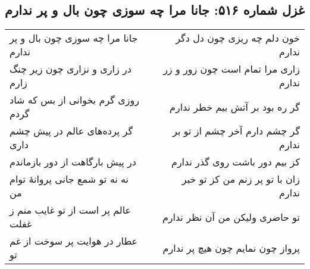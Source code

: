 \begin{center}
\section*{غزل شماره ۵۱۶: جانا مرا چه سوزی چون بال و پر ندارم}
\label{sec:516}
\begin{longtable}{l p{0.5cm} r}
جانا مرا چه سوزی چون بال و پر ندارم
&&
خون دلم چه ریزی چون دل دگر ندارم
\\
در زاری و نزاری چون زیر چنگ زارم
&&
زاری مرا تمام است چون زور و زر ندارم
\\
روزی گرم بخوانی از بس که شاد گردم
&&
گر ره بود بر آتش بیم خطر ندارم
\\
گر پرده‌های عالم در پیش چشم داری
&&
گر چشم دارم آخر چشم از تو بر ندارم
\\
در پیش بارگاهت از دور بازماندم
&&
کز بیم دور باشت روی گذر ندارم
\\
نه نه تو شمع جانی پروانهٔ توام من
&&
زان با تو پر زنم من کز تو خبر ندارم
\\
عالم پر است از تو غایب منم ز غفلت
&&
تو حاضری ولیکن من آن نظر ندارم
\\
عطار در هوایت پر سوخت از غم تو
&&
پرواز چون نمایم چون هیچ پر ندارم
\\
\end{longtable}
\end{center}
